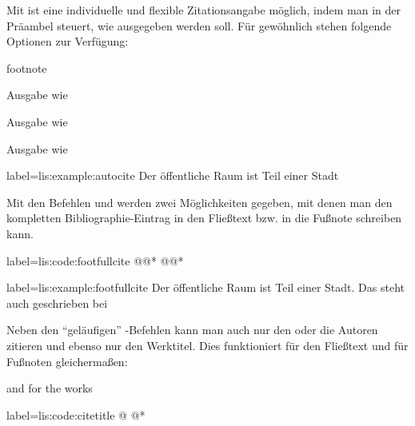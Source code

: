 Mit   ist eine individuelle und flexible Zitationsangabe möglich,
indem man in der Präambel steuert,
wie  ausgegeben werden soll.
Für gewöhnlich stehen folgende Optionen zur Verfügung:
\begin{labeling}{footnote}
	\item[plain] Ausgabe wie 
	\item[inline]Ausgabe wie 
	\item[footnote]Ausgabe wie 
\end{labeling}

\begin{lfgwexample}{label={lis:example:autocite}}
Der öffentliche Raum ist Teil einer Stadt \autocite{Osland2016} 
\end{lfgwexample}

Mit den Befehlen  und  werden zwei Möglichkeiten gegeben,
mit denen man den kompletten Bibliographie-Eintrag in den Fließtext bzw. in die Fußnote schreiben kann.
\begin{lfgwcode}{label={lis:code:footfullcite}}
\fullcite*@@*
\footfullcite*@@*
\end{lfgwcode} 

\begin{lfgwexample}{label={lis:example:footfullcite}}
Der öffentliche Raum ist Teil einer Stadt.
Das steht auch geschrieben bei 
\end{lfgwexample}



Neben den \enquote{geläufigen} -Befehlen kann man auch nur den oder die Autoren zitieren 
und ebenso nur den Werktitel.
Dies funktioniert für den Fließtext und für Fußnoten gleichermaßen:
  and for the works 
\begin{lfgwcode}{label={lis:code:citetitle}}
\citetitle *@ @*
\end{lfgwcode} 

